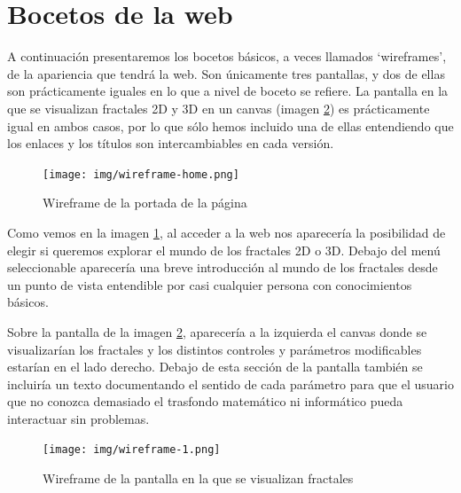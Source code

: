 \newpage
\section{Bocetos de la web}

A continuación presentaremos los bocetos básicos, a veces llamados `wireframes', de la apariencia que tendrá la web. Son únicamente tres pantallas, y dos de ellas son prácticamente iguales en lo que a nivel de boceto se refiere. La pantalla en la que se visualizan fractales 2D y 3D en un canvas (imagen \ref{fig:wireframe-fractals}) es prácticamente igual en ambos casos, por lo que sólo hemos incluido una de ellas entendiendo que los enlaces y los títulos son intercambiables en cada versión. 

\begin{figure} [ht]
    \centering
    \texttt{[image: img/wireframe-home.png]}
    \caption{Wireframe de la portada de la página}
    \label{fig:wireframe-home}
    \end{figure}



Como vemos en la imagen \ref{fig:wireframe-home}, al acceder a la web nos aparecería la posibilidad de elegir si queremos explorar el mundo de los fractales 2D o 3D. Debajo del menú seleccionable aparecería una breve introducción al mundo de los fractales desde un punto de vista entendible por casi cualquier persona con conocimientos básicos.


\newpage

Sobre la pantalla de la imagen \ref{fig:wireframe-fractals}, aparecería a la izquierda el canvas donde se visualizarían los fractales y los distintos controles y parámetros modificables estarían en el lado derecho. Debajo de esta sección de la pantalla también se incluiría un texto documentando el sentido de cada parámetro para que el usuario que no conozca demasiado el trasfondo matemático ni informático pueda interactuar sin problemas.

\begin{figure} [ht]
    \centering
    \texttt{[image: img/wireframe-1.png]}
    \caption{Wireframe de la pantalla en la que se visualizan fractales}
        \label{fig:wireframe-fractals}
    \end{figure}